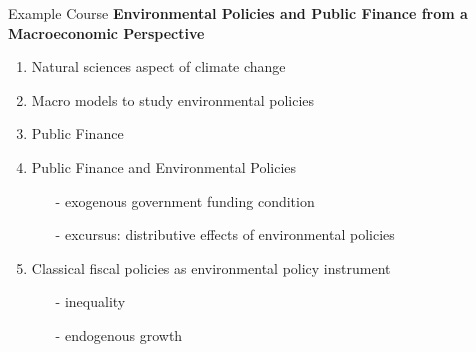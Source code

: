 	\begin{frame}{Example Course}
		\vspace{-2mm}
		\alert{\textbf{Environmental Policies and Public Finance from a Macroeconomic Perspective}}
		\pause
		\begin{enumerate}[<+->]
			\item Natural sciences aspect of climate change \footnotesize{\citep{Hassler2016EnvironmentalMacroeconomics, Hsiang2018AnScience}} \normalsize
			\item Macro models to study environmental policies \\ \footnotesize{\citep{Acemoglu2012TheChange, Golosov2014OptimalEquilibrium, Acemoglu2016TransitionTechnology, Fried2018ClimateAnalysis}} \normalsize
			\item Public Finance \footnotesize{\citep{ Domeij2004OnTaxes, Conesa2009TaxingAll, Heathcote2017OptimalFramework}} \normalsize
			\item Public Finance and Environmental Policies
			\begin{itemize}
				\item[-] exogenous government funding condition \\ \footnotesize{\citep{LansBovenberg1994EnvironmentalTaxation, Goulder1995EnvironmentalGuide, Barrage2019OptimalPolicy}}
				\item[-] excursus: distributive effects of environmental policies \\ \footnotesize{\citep{Fried2018TheGenerations, Goulder2019IncomeGroups, Kotlikoff2021MakingWin}}
			\end{itemize}
			\item Classical fiscal policies as environmental policy instrument
			\begin{itemize}
				\item[-] inequality \footnotesize{\citep{Jacobs2019RedistributionCurves, Dobkowitz2022, Douenne2022OptimalHouseholds}} \normalsize
				\item[-] endogenous growth \footnotesize{\citep{Dobkowitz2022}}
			\end{itemize}
		\end{enumerate}
	\end{frame}
	
